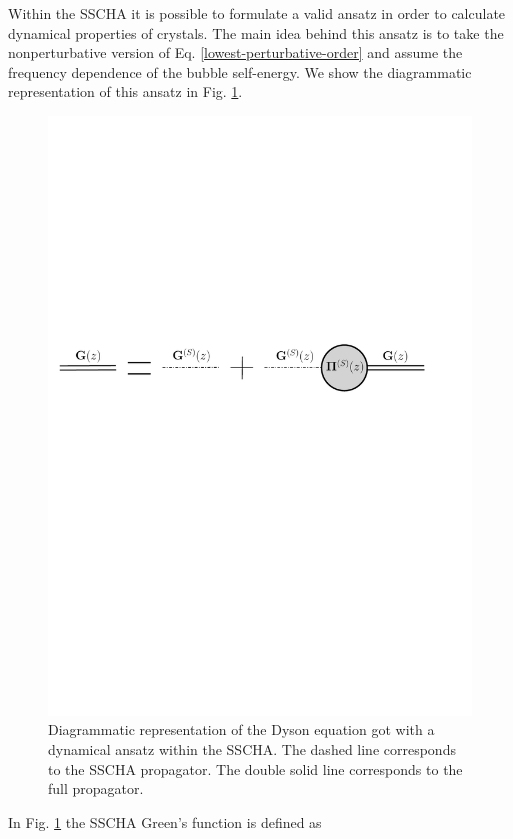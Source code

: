 Within the SSCHA it is possible to formulate a valid ansatz in order to calculate dynamical properties of crystals. The main idea behind this ansatz is to take the nonperturbative 
version of Eq. \ref{lowest-perturbative-order} and assume the frequency dependence of the bubble self-energy. We show the diagrammatic representation of this ansatz in Fig. \ref{green-ansatz}. 
\begin{figure}[h]
\begin{center}
\includegraphics[width=0.95\linewidth]{Figures/dyson-ansatz.pdf}
\caption[Diagramtic representation of Dyson equation got with a dynamical ansatz within the SSCHA]{Diagrammatic representation of the Dyson equation got with a dynamical ansatz within the SSCHA. The dashed line corresponds to the 
SSCHA propagator. The double solid line corresponds to the full propagator.}
\label{green-ansatz}
\end{center}
\end{figure}
In Fig. \ref{green-ansatz} the SSCHA Green's function is defined as
